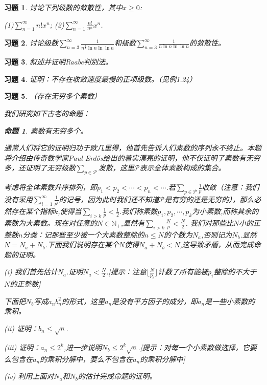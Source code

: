 \documentclass{article}
\newtheorem{proposition}{命题}[subsection]
\newtheorem{problem}{习题}[subsection]
\begin{document}
\begin{problem}
讨论下列级数的敛散性，其中$x\ge 0$:\par
(1)$\sum_{n=1}^\infty n!x^n$;\hspace{1cm}
(2)$\sum_{n=1}^\infty\frac{n!}{n^n}x^n$.
\end{problem}
\begin{problem}
讨论级数$\sum_{n=3}^\infty\frac{1}{n^\frac{1}{2}\ln n\ln\ln n}$和级数$\sum_{n=3}^\infty\frac{1}{n\ln n\ln\ln n}$的敛散性。
\end{problem}
\begin{problem}
叙述并证明Raabe判别法。
\end{problem}
\begin{problem}
证明：不存在收敛速度最慢的正项级数。（见例1.24）
\end{problem}
\begin{problem}\em（存在无穷多个素数）\par
我们研究如下古老的命题：
\begin{proposition}
素数有无穷多个。
\end{proposition}
通常人们将它的证明归功于欧几里得，他首先告诉人们素数的序列永不终止。本题将介绍由传奇数学家Paul Erdős给出的着实漂亮的证明，他不仅证明了素数有无穷多，还证明了无穷级数$\sum_{p\in\mathcal{P}}$发散，这里$\mathcal{P}$表示全体素数构成的集合。\par
考虑将全体素数升序排列，即$p_1<p_2<\cdots<p_n<\cdots$.若$\sum_{p\in\mathcal{P}}\frac{1}{p}$收敛（注意：我们没有采用$\sum_{i=1}^\infty\frac{1}{p^i}$的记号，因为此时我们还不知道$\mathcal{P}$是有穷的还是无穷的），那么必然存在某个指标$k$,使得当$\sum_{i>k}\frac{1}{p}<\frac{1}{2}$.我们称素数$p_1,p_2,\cdots,p_k$为\textit{小素数},而称其余的素数为\textit{大素数}。现在对任意的$N\in\mathbb{N}_+$,显然有$\sum_{i>k}\frac{N}{p}<\frac{N}{2}$. 我们对那些比$N$小的正整数$n$分类：记那些至少被一个大素数整除的$n\le N$的个数为$N_a$,否则记为$N_b$.显然$N=N_a+N_b$.下面我们说明存在某个$N$使得$N_a+N_b<N$,这导致矛盾，从而完成命题的证明。\par
(i) 我们首先估计$N_a$.证明$N_a<\frac{N}{2}$.[提示：注意$\lfloor \frac{N}{p_i} \rfloor $计数了所有能被$p_i$整除的不大于$N$的正整数]\par
下面把$N_b$写成$a_nb_n^2$的形式，这里$a_n$是没有平方因子的成分，即$a_n$是一些小素数的乘积。\par
(ii) 证明：$b_n\le\sqrt{n}$.\par
(iii) 证明：$a_n\le 2^k$,进一步说明$N_b\le 2^k\sqrt{n}$.[提示：对每一个小素数做选择，它要么包含在$a_n$的乘积分解中，要么不包含在$a_n$的乘积分解中]\par
(iv) 利用上面对$N_a$和$N_b$的估计完成命题的证明。
\end{problem}
\end{document}
